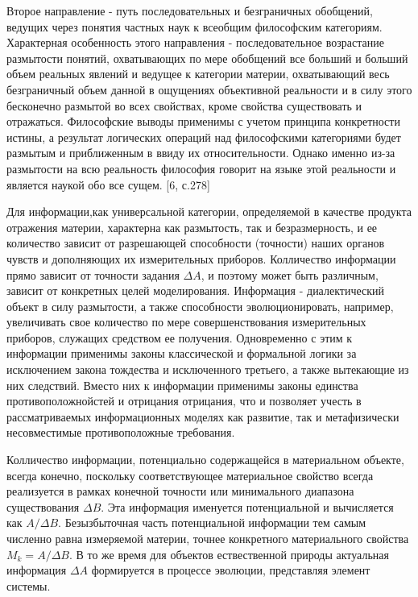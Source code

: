 \documentclass[a4paper,12pt]{report}
\begin{document}
 Второе направление - путь последовательных и безграничных обобщений, ведущих через понятия частных наук к всеобщим философским категориям. Характерная особенность этого направления - последовательное возрастание размытости понятий, охватывающих по мере обобщений все больший и больший объем реальных явлений и ведущее к категории материи, охватывающий весь безграничный объем данной в ощущениях объективной реальности и в силу этого бесконечно размытой во всех свойствах, кроме свойства существовать и отражаться. Философские выводы применимы с учетом принципа конкретности истины, а результат логических операций над философскими категориями будет размытым и приближенным в ввиду их относительности. Однако именно из-за размытости на всю реальность философия говорит на языке этой реальности и является наукой обо все сущем. [6, с.278] 
 
 Для информации,как универсальной категории, определяемой в качестве продукта отражения материи, характерна как размытость, так и безразмерность, и ее количество зависит от разрешающей способности (точности) наших органов чувств и дополняющих их измерительных приборов. Колличество информации прямо зависит от точности задания $\Delta A$, и поэтому может быть различным, зависит от конкретных целей моделирования. Информация - диалектический объект в силу размытости, а также способности эволюционировать, например, увеличивать свое количество по мере совершенствования измерительных приборов, служащих средством ее получения. Одновременно с этим к информации применимы законы классической и формальной логики за исключением закона тождества и исключенного третьего, а также вытекающие из них следствий. Вместо них к информации применимы законы единства противоположнойстей и отрицания отрицания, что и позволяет учесть в рассматриваемых информационных моделях как развитие, так и метафизически несовместимые противоположные требования.
 
  Колличество информации, потенциально содержащейся в материальном объекте, всегда конечно, поскольку соответствующее материальное свойство всегда реализуется в рамках конечной точности или минимального диапазона существования $\Delta B$. Эта информация именуется потенциальной и вычисляется как $A/ \Delta B$. Безызбыточная часть потенциальной информации тем самым численно равна измеряемой материи, точнее конкретного материального свойства $ M_k = A/ \Delta B$. В то же время для объектов ествественной природы актуальная информация $\Delta A$ формируется в процессе эволюции, представляя элемент системы.
  
\end{document}
